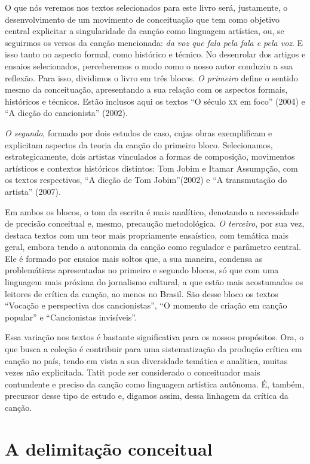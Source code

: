 O que nós veremos nos textos selecionados para este livro será,
justamente, o desenvolvimento de um movimento de conceituação que tem
como objetivo central explicitar a singularidade da canção como
linguagem artística, ou, se seguirmos os versos da canção mencionada:
\emph{da voz que fala pela fala e pela voz}. E isso tanto no aspecto
formal, como histórico e técnico. No desenrolar dos artigos e ensaios
selecionados, perceberemos o modo como o nosso autor conduziu a sua
reflexão. Para isso, dividimos o livro em três blocos. \emph{O primeiro}
define o sentido mesmo da conceituação, apresentando a sua relação com
os aspectos formais, históricos e técnicos. Estão inclusos aqui os
textos ``O século \textsc{xx} em foco'' (2004) e ``A dicção do
cancionista'' (2002).

\emph{O segundo}, formado por dois estudos de caso, cujas obras
exemplificam e explicitam aspectos da teoria da canção do primeiro
bloco. Selecionamos, estrategicamente, dois artistas vinculados a formas
de composição, movimentos artísticos e contextos históricos distintos:
Tom Jobim e Itamar Assumpção, com os textos respectivos, ``A dicção
de Tom Jobim''(2002) e ``A transmutação do artista'' (2007).

Em ambos os blocos, o tom da escrita é mais analítico, denotando a
necessidade de precisão conceitual e, mesmo, precaução metodológica.
\emph{O terceiro}, por sua vez, destaca textos com um teor mais
propriamente ensaístico, com temática mais geral, embora tendo a
autonomia da canção como regulador e parâmetro central. Ele é formado
por ensaios mais soltos que, a sua maneira, condensa as problemáticas
apresentadas no primeiro e segundo blocos, só que com uma linguagem mais
próxima do jornalismo cultural, a que estão mais acostumados os leitores
de crítica da canção, ao menos no Brasil. São desse bloco os textos
``Vocação e perspectiva dos cancionistas'', ``O momento de
criação em canção popular'' e ``Cancionistas invisíveis''.

Essa variação nos textos é bastante significativa para os nossos
propósitos. Ora, o que busca a coleção é contribuir para uma
sistematização da produção crítica em canção no país, tendo em vista a
sua diversidade temática e analítica, muitas vezes não explicitada.
Tatit pode ser considerado o conceituador mais contundente e preciso da
canção como linguagem artística autônoma. É, também, precursor desse
tipo de estudo e, digamos assim, dessa linhagem da crítica da canção.

\section{A delimitação conceitual}


